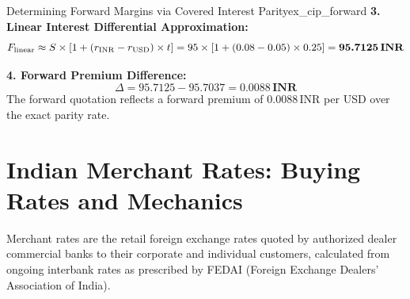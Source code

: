 \begin{example}{Determining Forward Margins via Covered Interest Parity}{ex_cip_forward}
\noindent\textbf{3. Linear Interest Differential Approximation:}
\begin{equation*}
    F_{\text{linear}} \approx S \times [1 + (r_{\text{INR}} - r_{\text{USD}}) \times t] = 95 \times [1 + (0.08 - 0.05) \times 0.25] = \textbf{95.7125\,INR}
\end{equation*}

\noindent\textbf{4. Forward Premium Difference:}
\begin{equation*}
    \Delta = 95.7125 - 95.7037 = \mathbf{0.0088\,INR}
\end{equation*}
The forward quotation reflects a forward premium of $0.0088\,\text{INR}$ per USD over the exact parity rate.
\end{example}

\section{Indian Merchant Rates: Buying Rates and Mechanics}

Merchant rates are the retail foreign exchange rates quoted by authorized dealer commercial banks to their corporate and individual customers, calculated from ongoing interbank rates as prescribed by FEDAI (Foreign Exchange Dealers' Association of India).

